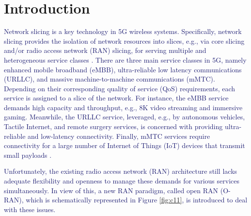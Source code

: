 \documentclass[lettersize,journal]{IEEEtran}
\begin{document}
\section{Introduction}
\textcolor{MidnightBlue}{Network slicing is a key technology in 5G wireless systems. Specifically, network slicing provides the isolation of network resources into slices, e.g., via core slicing and/or radio access network (RAN) slicing, for serving multiple and heterogeneous service classes \cite{shen2020ai,setayesh2020joint,popovski20185g}. There are three main service classes in 5G, namely enhanced mobile broadband (eMBB), ultra-reliable low latency communications (URLLC), and massive machine-to-machine communications (mMTC). Depending on their corresponding quality of service (QoS) requirements, each service is assigned to a slice of the network.
For instance, the eMBB service demands high capacity and throughput,  e.g., 8K video streaming and immersive gaming. Meanwhile, the URLLC service, leveraged, e.g., by autonomous vehicles, Tactile Internet, and remote surgery services, is concerned with providing ultra-reliable and low-latency connectivity. Finally, mMTC services require connectivity for a large number of Internet of Things (IoT) devices that transmit small payloads \cite{dogra2020survey,alsenwi2021intelligent,SL}.}

\textcolor{MidnightBlue}{Unfortunately, the existing radio access network (RAN) architecture still lacks adequate flexibility and openness to manage these demands for various services simultaneously. In view of this, a new RAN paradigm, called open RAN (O-RAN), which is schematically represented in Figure \ref{fig:c11}, is introduced to deal with these issues.}
\end{document}
